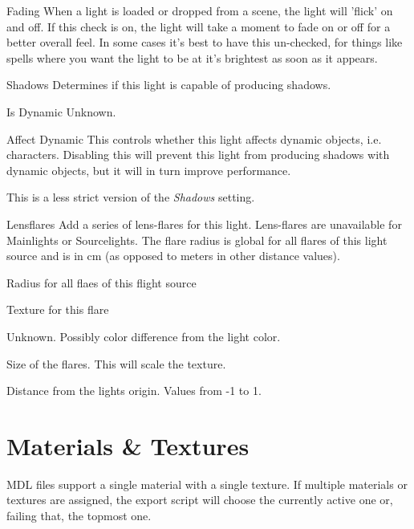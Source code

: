 \begin{propertyAurora}{Fading}
When a light is loaded or dropped from a scene, the light will 'flick' on and off. 
If this check is on, the light will take a moment to fade on or off for a better overall feel.
In some cases it’s best to have this un-checked, for things like spells where you want 
the light to be at it’s brightest as soon as it appears.
\end{propertyAurora}

\begin{propertyAurora}{Shadows}
Determines if this light is capable of producing shadows.
\end{propertyAurora}

\begin{propertyAurora}{Is Dynamic}
Unknown.
\end{propertyAurora}

\begin{propertyAurora}{Affect Dynamic}
This controls whether this light affects dynamic objects, i.e. characters.
Disabling this will prevent this light from producing shadows with dynamic
objects, but it will in turn improve performance.

This is a less strict version of the \textit{Shadows} setting.
\end{propertyAurora}

\begin{propertyAurora}{Lensflares}
Add a series of lens-flares for this light. Lens-flares are unavailable for 
Mainlights or Sourcelights. The flare radius is global for all flares of 
this light source and is in cm (as opposed to meters in other distance values).
\begin{description}[labelindent=\parindent,leftmargin=7em,style=nextline]
    \item[Radius] Radius for all flaes of this flight source
    \item[Texture] Texture for this flare
    \item[Colorshift] Unknown. Possibly color difference from the light color.
    \item[Size] Size of the flares. This will scale the texture.
    \item[Position] Distance from the lights origin. Values from -1 to 1.
\end{description}
\end{propertyAurora}

\section{Materials \& Textures}
MDL files support a single material with a single texture. If multiple 
materials or textures are assigned, the export script will choose the currently 
active one or, failing that, the topmost one.


